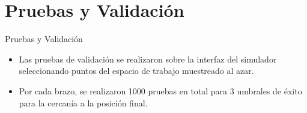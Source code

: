 \documentclass[spanish,10pt]{beamer}
\begin{document}
	\section{Pruebas y Validación}
	\begin{frame}{Pruebas y Validación}
		\begin{itemize}
			\item Las pruebas de validación se realizaron sobre la interfaz del simulador seleccionando puntos del espacio de trabajo muestreado al azar. 
			\item Por cada brazo, se realizaron 1000 pruebas en total para 3 umbrales de éxito para la cercanía a la posición final.
		\end{itemize}
		
		\begin{figure}[h!]
			\centering
			

\end{figure}
\end{frame}
\end{document}

